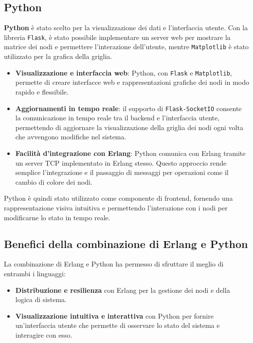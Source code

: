 \documentclass[12pt, a4paper]{report}
\begin{document}
\subsection{Python}

\textbf{Python} è stato scelto per la visualizzazione dei dati e l’interfaccia utente. Con la libreria \texttt{Flask}, è stato possibile implementare un server web per mostrare la matrice dei nodi e permettere l'interazione dell'utente, mentre \texttt{Matplotlib} è stato utilizzato per la grafica della griglia.

\begin{itemize}
    \item \textbf{Visualizzazione e interfaccia web}: Python, con \texttt{Flask} e \texttt{Matplotlib}, permette di creare interfacce web e rappresentazioni grafiche dei nodi in modo rapido e flessibile.
    \item \textbf{Aggiornamenti in tempo reale}: il supporto di \texttt{Flask-SocketIO} consente la comunicazione in tempo reale tra il backend e l'interfaccia utente, permettendo di aggiornare la visualizzazione della griglia dei nodi ogni volta che avvengono modifiche nel sistema.
    \item \textbf{Facilità d'integrazione con Erlang}: Python comunica con Erlang tramite un server TCP implementato in Erlang stesso. Questo approccio rende semplice l'integrazione e il passaggio di messaggi per operazioni come il cambio di colore dei nodi.
\end{itemize}

Python è quindi stato utilizzato come componente di frontend, fornendo una rappresentazione visiva intuitiva e permettendo l'interazione con i nodi per modificarne lo stato in tempo reale.

\subsection{Benefici della combinazione di Erlang e Python}

La combinazione di Erlang e Python ha permesso di sfruttare il meglio di entrambi i linguaggi:
\begin{itemize}
    \item \textbf{Distribuzione e resilienza} con Erlang per la gestione dei nodi e della logica di sistema.
    \item \textbf{Visualizzazione intuitiva e interattiva} con Python per fornire un’interfaccia utente che permette di osservare lo stato del sistema e interagire con esso.
\end{itemize}
\end{document}
